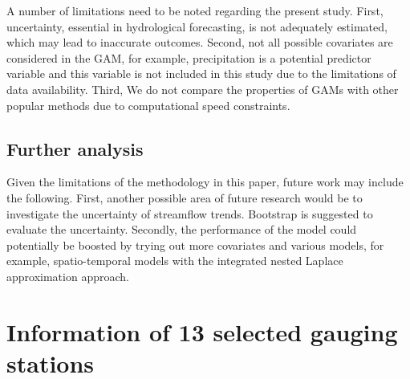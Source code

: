 \documentclass[12pt,oneside]{reedthesis}
\begin{document}
A number of limitations need to be noted regarding the present study. First, uncertainty, essential in hydrological forecasting, is not adequately estimated, which may lead to inaccurate outcomes. Second, not all possible covariates are considered in the GAM, for example, precipitation is a potential predictor variable and this variable is not included in this study due to the limitations of data availability. Third, We do not compare the properties of GAMs with other popular methods due to computational speed constraints.

\hypertarget{further-analysis}{%
\section{Further analysis}\label{further-analysis}}

Given the limitations of the methodology in this paper, future work may include the following. First, another possible area of future research would be to investigate the uncertainty of streamflow trends.
Bootstrap is suggested to evaluate the uncertainty. Secondly, the performance of the model could potentially be boosted by trying out more covariates and various models, for example, spatio-temporal models with the integrated nested Laplace approximation approach.

\appendix

\hypertarget{infor}{%
\chapter{Information of 13 selected gauging stations}\label{infor}}
\end{document}
